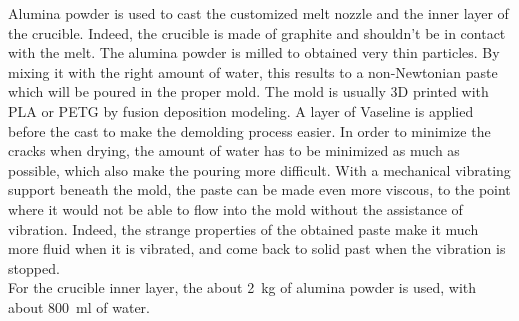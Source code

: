 \documentclass[../../main.tex]{subfiles}
\begin{document}
Alumina powder is used to cast the customized melt nozzle and the inner layer of the crucible. Indeed, the crucible is made of graphite and shouldn't be in contact with the melt. The alumina powder is milled to obtained very thin particles. By mixing it with the right amount of water, this results to a non-Newtonian paste which will be poured in the proper mold. The mold is usually 3D printed with PLA or PETG by fusion deposition modeling. A layer of Vaseline is applied before the cast to make the demolding process easier. In order to minimize the cracks when drying, the amount of water has to be minimized as much as possible, which also make the pouring more difficult. With a mechanical vibrating support beneath the mold, the paste can be made even more viscous, to the point where it would not be able to flow into the mold without the assistance of vibration. Indeed, the strange properties of the obtained paste make it much more fluid when it is vibrated, and come back to solid past when the vibration is stopped.\\

For the crucible inner layer, the about 2~kg of alumina powder is used, with about 800~ml of water.
\end{document}
